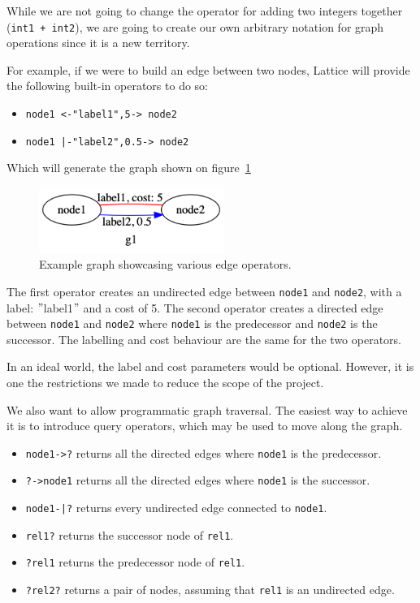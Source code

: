 While we are not going to change the operator for adding two integers together (\lstinline{int1 + int2}),
we are going to create our own arbitrary notation for graph operations since it is a new territory.

For example, if we were to build an edge between two nodes,
Lattice will provide the following built-in operators to do so:

\begin{itemize}
    \item \lstinline{node1 <-"label1",5-> node2}
    \item \lstinline{node1 |-"label2",0.5-> node2}
\end{itemize}

Which will generate the graph shown on figure~\ref{fig:relation_basic_operator}
\begin{figure}[H]
    \centering
    \includegraphics[width=6cm]{figures/syntax_section/syntax_rel_basic}
    \caption{Example graph showcasing various edge operators.}
    \label{fig:relation_basic_operator}
\end{figure}


The first operator creates an undirected edge between \lstinline{node1} and \lstinline{node2}, with a label: \("\)label1\("\) and a cost of 5.
The second operator creates a directed edge between \lstinline{node1} and \lstinline{node2} where \lstinline{node1}
is the predecessor and \lstinline{node2} is the successor.
The labelling and cost behaviour are the same for the two operators.

In an ideal world, the label and cost parameters would be optional.
However, it is one the restrictions we made to reduce the scope of the project.

We also want to allow programmatic graph traversal.
The easiest way to achieve it is to introduce query operators, which may be used to move along the graph.

\begin{itemize}
    \item \lstinline{node1->?} returns all the directed edges where \lstinline{node1} is the predecessor.
    \item \lstinline{?->node1} returns all the directed edges where \lstinline{node1} is the successor.
    \item \lstinline{node1-|?} returns every undirected edge connected to \lstinline{node1}.
    \item \lstinline{rel1?} returns the successor node of \lstinline{rel1}.
    \item \lstinline{?rel1} returns the predecessor node of \lstinline{rel1}.
    \item \lstinline{?rel2?} returns a pair of nodes, assuming that \lstinline{rel1} is an undirected edge.
\end{itemize}

